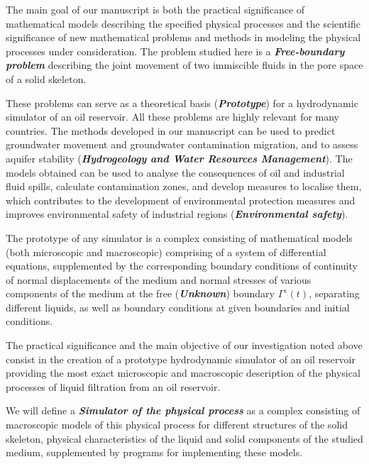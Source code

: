 \documentclass{article}
\theoremstyle{plain}
\theoremstyle{definition}
\numberwithin{equation}{section}
\begin{document}
The main goal of our manuscript is both the practical significance of mathematical models describing the specified physical processes and the scientific significance of new mathematical problems and methods in modeling the physical processes under consideration. The problem studied here is a \emph{\textbf{Free-boundary problem}} describing the joint movement of two immiscible fluids in the pore space of a solid skeleton.

These problems can serve as a theoretical basis (\textbf{\emph{Prototype}}) for a hydrodynamic simulator of an oil reservoir. All these problems are highly relevant for many countries. The methods developed in our manuscript can be used to predict groundwater movement and groundwater contamination migration, and to assess aquifer stability (\emph{\textbf{Hydrogeology and Water Resources Management}}). The models obtained can be used to analyse the consequences of oil and industrial fluid spills, calculate contamination zones, and develop measures to localise them, which contributes to the development of environmental protection measures and improves environmental safety of industrial regions (\emph{\textbf{Environmental safety}}).

The prototype of any simulator is a complex consisting of mathematical models (both microscopic and macroscopic) comprising of a system of differential equations, supplemented by the corresponding boundary conditions of continuity of normal displacements of the medium and normal stresses of various components of the medium at the free (\emph{\textbf{Unknown}}) boundary $\Gamma^{\varepsilon}(t)$, separating different liquids, as well as boundary conditions at given boundaries and initial conditions.

The practical significance and the main objective of our investigation noted above consist in the creation of a prototype hydrodynamic simulator of an oil reservoir providing the most exact microscopic and macroscopic description of the physical processes of liquid filtration from an oil reservoir.

We will define a \textbf{\emph{Simulator of the physical process}} as a complex consisting of macroscopic models of this physical process for different structures of the solid skeleton, physical characteristics of the liquid and solid components of the studied medium, supplemented by programs for implementing these models.
\end{document}
